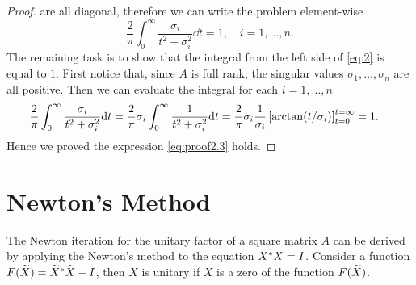 \documentclass[12pt]{article}
\begin{document}
\begin{proof}
    are all diagonal, therefore we can write the problem element-wise
    \begin{equation}
        \label{eq:2}
        \frac{2}{\pi}\int_0^\infty \frac{\sigma_i}{t^2 + \sigma_i^2} \dd t = 1,\quad \text{$i = 1,\dots,n$.}
    \end{equation}
    The remaining task is to show that the integral from the left side of \eqref{eq:2} is equal to $1$. First notice that, since $A$ is full rank, the singular values $\sigma_1, \dots, \sigma_n$ are all positive. Then we can evaluate the integral for each $i = 1,\dots,n$
    \begin{equation}
        \notag 
        \begin{aligned}
            \frac{2}{\pi}\int_0^\infty \frac{\sigma_i}{t^2 + \sigma_i^2} \mathrm{d} t & = \frac{2}{\pi} \sigma_i \int_0^\infty \frac{1}{t^2  + \sigma_i^2}\mathrm{d} t = \frac{2}{\pi}\sigma_i \frac{1}{\sigma_i} \left[\arctan(t/\sigma_i)\right]_{t = 0}^{t = \infty} = 1. 
        \end{aligned}
    \end{equation}
    Hence we proved the expression \eqref{eq:proof2.3} holds.
\end{proof}

\section{Newton's Method}

The Newton iteration for the unitary factor of a square matrix $A$ can be derived by applying the Newton's method to the equation $X^* X = I$. Consider a function $F(\widetilde X) = \widetilde X^* \widetilde X - I$, then $X$ is unitary if $X$ is a zero of the function $F(\widetilde X)$. 
\end{document}
